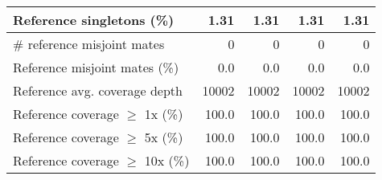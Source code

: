 \documentclass[12pt,a4paper]{article}
\begin{document}
\begin{table}[ht]
\begin{center}
\begin{tabular}{|l*{4}{|r}|}
Reference singletons (\%) & 1.31 & 1.31 & 1.31 & 1.31 \\ \hline
\# reference misjoint mates & 0 & 0 & 0 & 0 \\ \hline
Reference misjoint mates (\%) & 0.0 & 0.0 & 0.0 & 0.0 \\ \hline
Reference avg. coverage depth & 10002 & 10002 & 10002 & 10002 \\ \hline
Reference coverage $\geq$ 1x (\%) & 100.0 & 100.0 & 100.0 & 100.0 \\ \hline
Reference coverage $\geq$ 5x (\%) & 100.0 & 100.0 & 100.0 & 100.0 \\ \hline
Reference coverage $\geq$ 10x (\%) & 100.0 & 100.0 & 100.0 & 100.0 \\ \hline
\end{tabular}
\end{center}
\end{table}
\end{document}
